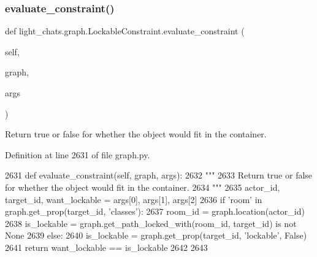 \subsubsection{\texorpdfstring{evaluate\+\_\+constraint()}{evaluate\_constraint()}}
{\footnotesize\ttfamily def light\+\_\+chats.\+graph.\+Lockable\+Constraint.\+evaluate\+\_\+constraint (\begin{DoxyParamCaption}\item[{}]{self,  }\item[{}]{graph,  }\item[{}]{args }\end{DoxyParamCaption})}

\begin{DoxyVerb}Return true or false for whether the object would fit in the container.
\end{DoxyVerb}
 

Definition at line 2631 of file graph.\+py.


\begin{DoxyCode}
2631     \textcolor{keyword}{def }evaluate\_constraint(self, graph, args):
2632         \textcolor{stringliteral}{"""}
2633 \textcolor{stringliteral}{        Return true or false for whether the object would fit in the container.}
2634 \textcolor{stringliteral}{        """}
2635         actor\_id, target\_id, want\_lockable = args[0], args[1], args[2]
2636         \textcolor{keywordflow}{if} \textcolor{stringliteral}{'room'} \textcolor{keywordflow}{in} graph.get\_prop(target\_id, \textcolor{stringliteral}{'classes'}):
2637             room\_id = graph.location(actor\_id)
2638             is\_lockable = graph.get\_path\_locked\_with(room\_id, target\_id) \textcolor{keywordflow}{is} \textcolor{keywordflow}{not} \textcolor{keywordtype}{None}
2639         \textcolor{keywordflow}{else}:
2640             is\_lockable = graph.get\_prop(target\_id, \textcolor{stringliteral}{'lockable'}, \textcolor{keyword}{False})
2641         \textcolor{keywordflow}{return} want\_lockable == is\_lockable
2642 
2643 
\end{DoxyCode}
\mbox{\label{classlight__chats_1_1graph_1_1LockableConstraint_abab472da88c21dc3ea5f7ee874bad9d4}} 
